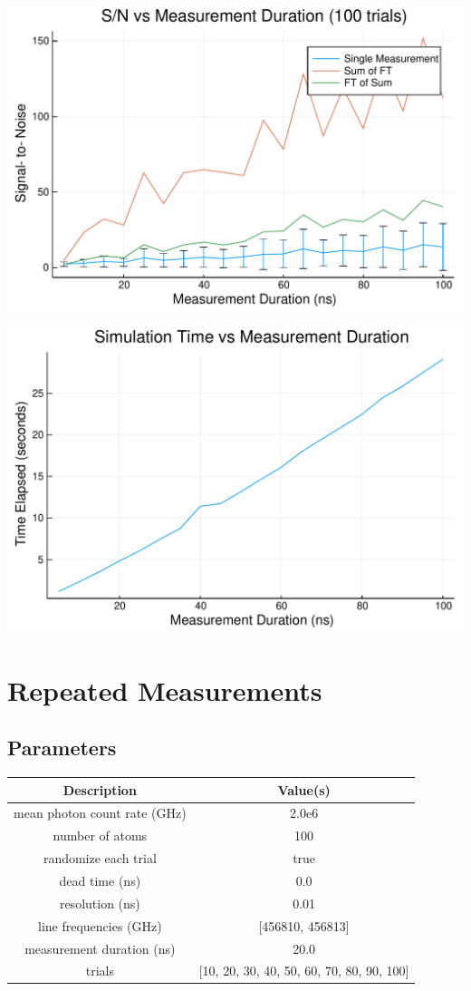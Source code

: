 \documentclass[12pt,a4paper]{article}
\begin{document}
\includegraphics[width=\linewidth]{jl_PKMVtA/simnb_12_1.pdf}

\includegraphics[width=\linewidth]{jl_PKMVtA/simnb_13_1.pdf}

\section{Repeated Measurements}


\subsection{Parameters}
\begin{tabular}
{c | c}
Description & Value(s) \\
\hline
mean photon count rate (GHz) & 2.0e6 \\
number of atoms & 100 \\
randomize each trial & true \\
dead time (ns) & 0.0 \\
resolution (ns) & 0.01 \\
line frequencies (GHz) & [456810, 456813] \\
measurement duration (ns) & 20.0 \\
trials & [10, 20, 30, 40, 50, 60, 70, 80, 90, 100] \\
\end{tabular}
\end{document}
